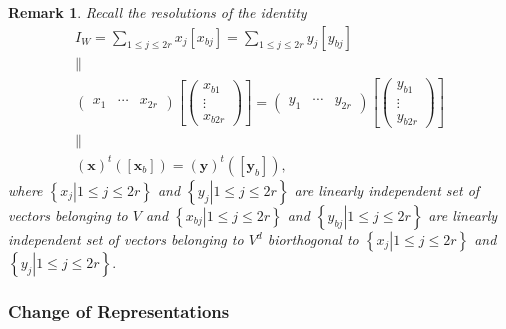 \documentclass[aps,preprint]{revtex4}
\newtheorem{remark}[theorem]{Remark}
\begin{document}
\begin{remark}
Recall the resolutions of the identity 
\begin{gather}
I_{W}=\sum_{1\leq j\leq 2r}x_{j}\left[ x_{bj}\right] =\sum_{1\leq j\leq
2r}y_{j}\left[ y_{bj}\right] \\
\parallel \\
\left( 
\begin{array}{ccc}
x_{1} & \cdots & x_{2r}%
\end{array}%
\right) \left[ \left( 
\begin{array}{c}
x_{b1} \\ 
\vdots \\ 
x_{b2r}%
\end{array}%
\right) \right] =\left( 
\begin{array}{ccc}
y_{1} & \cdots & y_{2r}%
\end{array}%
\right) \left[ \left( 
\begin{array}{c}
y_{b1} \\ 
\vdots \\ 
y_{b2r}%
\end{array}%
\right) \right] \\
\parallel \\
\left( \boldsymbol{x}\right) ^{t}\left( \left[ \boldsymbol{x}_{b}\right]
\right) =\left( \boldsymbol{y}\right) ^{t}\left( \left[ \boldsymbol{y}_{b}%
\right] \right) ,
\end{gather}%
where $\left\{ \left. x_{j}\right\vert 1\leq j\leq 2r\right\} $ and $\left\{
\left. y_{j}\right\vert 1\leq j\leq 2r\right\} $ are linearly independent
set of vectors belonging to $V$ and $\left\{ \left. x_{bj}\right\vert 1\leq
j\leq 2r\right\} $ and $\left\{ \left. y_{bj}\right\vert 1\leq j\leq
2r\right\} $ are linearly independent set of vectors belonging to $V^{d}$
biorthogonal to $\left\{ \left. x_{j}\right\vert 1\leq j\leq 2r\right\} $
and $\left\{ \left. y_{j}\right\vert 1\leq j\leq 2r\right\} .$
\end{remark}

\subsubsection{\textbf{Change of} \textbf{Representations}}
\end{document}
